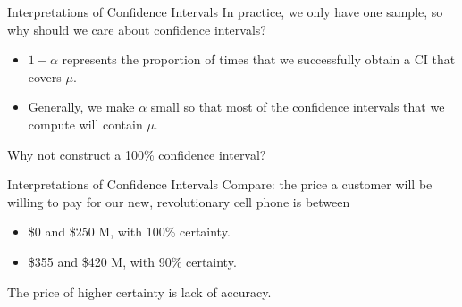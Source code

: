 \documentclass{beamer}
\begin{document}
\begin{frame}{Interpretations of Confidence Intervals}
In practice, we only have one sample, so why should we care about confidence intervals?
\begin{itemize}
\item $1-\alpha$ represents the proportion of times that we successfully obtain a CI that covers $\mu$.
\item Generally, we make $\alpha$ small so that most of the confidence intervals that we compute will contain $\mu$.
\end{itemize}

Why not construct a 100\% confidence interval?
\end{frame}

\begin{frame}{Interpretations of Confidence Intervals}
Compare: the price a customer will be willing to pay for our new, revolutionary cell phone is between
\begin{itemize}
\item \$0 and \$250 M, with 100\% certainty.
\item \$355 and \$420 M, with 90\% certainty.
\end{itemize}

The price of higher certainty is lack of accuracy.
\end{frame}



\end{document}
